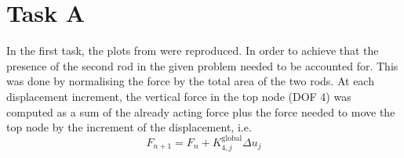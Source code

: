 \section{Task A}
\label{sec:task-a}

In the first task, the plots from \cite{Bonet2008} were reproduced.
In order to achieve that the presence of the second rod in the given
problem needed to be accounted for.
This was done by normalising the force by the total area of the two rods.
At each displacement increment, the vertical force in the top node (DOF 4)
was computed as a sum of the already acting force plus the force
needed to move the top node by the increment of the displacement,
i.e.
\begin{equation}
  F_{n+1} = F_{n} + K^{\text{global}}_{4,j} \Delta u_{j}
\end{equation}


